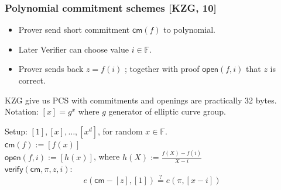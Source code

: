 \documentclass[shadesubsections,compress,14pt,mathserif]{beamer}
\newcommand{\F}{\ensuremath{\mathbb F}}
\newcommand{\enc}[1]{\ensuremath{\left[#1\right ]}}
\newcommand{\cm}{\ensuremath{\mathsf{cm}}}
\newcommand{\open}[1]{\ensuremath{\mathsf{open}(#1)}}
\newcommand{\verify}[1]{\ensuremath{\mathsf{verify}(#1)}}
\newcommand{\defeq}{\ensuremath{:=}}
\begin{document}
\begin{frame}
 \frametitle{Polynomial commitment schemes {\small [KZG, 10]}}   %
\begin{itemize}
 \item Prover send short commitment $\cm(f)$ to polynomial.\pause
 \item Later Verifier can choose value $i\in \F$.\pause
 \item Prover sends back $z=f(i)$ ; together with proof $\open{f,i}$ that $z$ is correct.\pause
\end{itemize}
KZG give us PCS with commitments and openings are practically 32 bytes.\\ 
Notation: $\enc{x}=g^x$ where $g$ generator of elliptic curve group.
\end{frame}


\begin{frame}

 Setup: $\enc{1},\enc{x},\ldots,\enc{x^d}$, for random $x\in \F$.\\ \pause
 \vspace{0.4in}
 $\cm(f)\defeq   \enc{f(x)}$\\ \pause
 \vspace{0.4in}
$\open{f,i}\defeq \enc{h(x)}$, where
 $h(X)\defeq \frac{f(X)-f(i)}{X-i}$\\ \pause
 \vspace{0.4in}
 $\verify{\cm,\pi,z,i}:$
\[e(\cm-\enc{z},\enc{1}) \stackrel{?}{=} e(\pi, \enc{x-i})\]
\end{frame}


 
\end{document}
